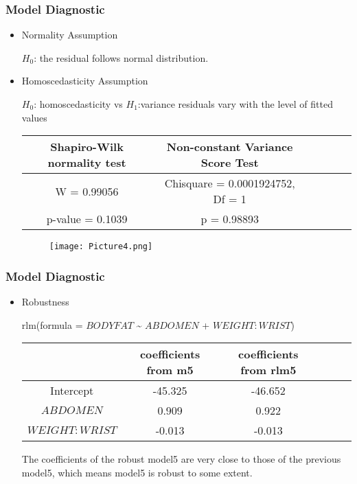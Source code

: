\documentclass{beamer}
\begin{document}

\begin{frame}
\frametitle{Model Diagnostic}
\begin{itemize}
\item Normality Assumption

$H_{0}$: the residual follows normal distribution.


\item Homoscedasticity Assumption

$H_{0}$: homoscedasticity vs $H_{1}$:variance residuals vary with the level of fitted values

\begin{table}
\small
\begin{center}
\begin{tabular}{cccccc}
\toprule
Shapiro-Wilk normality test & Non-constant Variance Score Test  \\
\midrule
W = 0.99056 & Chisquare = 0.0001924752, Df = 1  \\
p-value = 0.1039 & p = 0.98893  \\

\bottomrule
\end{tabular}
\end{center}
\end{table}

\begin{figure}[h]
   \centering
   \texttt{[image: Picture4.png]}
\end{figure}

\end{itemize}
\end{frame}


\begin{frame}
\frametitle{Model Diagnostic}
\begin{itemize}
\item Robustness

rlm(formula = $BODYFAT$ \~{} $ABDOMEN$ + $WEIGHT:WRIST$)

\begin{table}
\begin{center}
\begin{tabular}{cccccc}
\toprule
   &   coefficients from m5 & coefficients from rlm5 \\
\midrule
Intercept &  -45.325 &  -46.652  \\
$ABDOMEN$  & 0.909 & 0.922  \\
$WEIGHT:WRIST$ &  -0.013 & -0.013 &  \\

\bottomrule
\end{tabular}
\end{center}
\end{table}

The coefficients of the robust model5 are very close to those of the previous model5, which means model5 is robust to some extent.

\end{itemize}
\end{frame}
\end{document}
